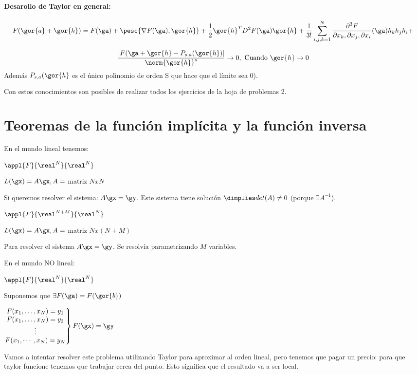 \documentclass{apuntes}
\begin{document}
\paragraph{Desarollo de Taylor en general:}

$$F(\gor{a}+\gor{h}) = F(\ga) + \pesc{\nabla F(\ga),\gor{h}} + \frac{1}{2} \gor{h}^T D^2F(\ga)\gor{h} + \frac{1}{3!}\sum_{i,j,k=1}^N \frac{\partial^3F}{\partial x_k,\partial x_j, \partial x_i} (\ga) h_kh_jh_i + $$

\begin{theorem}
 $$\frac{|F(\ga+\gor{h} - P_{s,a}(\gor{h})|}{\norm{\gor{h}}^s} \rightarrow 0, \text{ Cuando } \gor{h} \rightarrow 0$$
 Además $P_{s,a}(\gor{h}$ es el único polinomio de orden S que hace que el límite sea 0).
\end{theorem}

Con estos conocimientos son posibles de realizar todos los ejercicios de la hoja de problemas 2.

\section{Teoremas de la función implícita y la función inversa}

En el mundo lineal tenemos:

$\appl{F}{\real^N}{\real^N}$

$L(\gx) = A\gx,  A = $ matriz $NxN$

Si queremos resolver el sistema: $A\gx = \gy$. Este sistema tiene solución $\dimplies det(A) \neq 0$ (porque $\exists A^{-1}$).

$\appl{F}{\real^{N+M}}{\real^N}$

$L(\gx) = A\gx, A = $ matriz $Nx(N+M)$

Para resolver el sistema $A\gx = \gy$.  Se resolvía parametrizando $M$ variables.

En el mundo NO lineal:

$\appl{F}{\real^N}{\real^N}$

Suponemos que $\exists F(\ga) = F(\gor{b})$

$\left.\begin{matrix}
F(x_1,\dotsc,x_N) = y_1\\
F(x_1,\dotsc,x_N) = y_2\\
\vdots\\
F(x_1,\cdots,x_N) = y_N          
        \end{matrix}
\right\} F(\gx)=\gy$

Vamos a intentar resolver este problema utilizando Taylor para aproximar al orden lineal, pero tenemos que pagar un precio: para que taylor funcione tenemos que trabajar cerca del punto. Esto significa que el resultado va a ser local.
\end{document}
